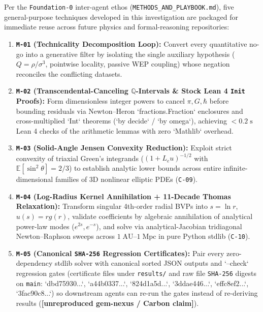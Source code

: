 \documentclass[11pt,letterpaper]{article}
\newcommand{\unrepro}{\textbf{\textcolor{red!60!black}{[unreproduced gem-nexus / Carbon claim]}}}
\begin{document}
Per the \texttt{Foundation-0} inter-agent ethos (\texttt{METHODS\_AND\_PLAYBOOK.md}), five general-purpose techniques developed in this investigation are packaged for immediate reuse across future physics and formal-reasoning repositories:
\begin{enumerate}
  \setlength{\itemsep}{2pt}\setlength{\parskip}{0pt}
  \item \textbf{\texttt{M-01} (Technicality Decomposition Loop):} Convert every quantitative no-go into a generative filter by isolating the single auxiliary hypothesis ($Q=\rho/\sigma^3$, pointwise locality, passive WEP coupling) whose negation reconciles the conflicting datasets.
  \item \textbf{\texttt{M-02} (Transcendental-Canceling $\mathbb{Q}$-Intervals \& Stock Lean 4 \texttt{Init} Proofs):} Form dimensionless integer powers to cancel $\pi, G, \hbar$ before bounding residuals via Newton--Heron `fractions.Fraction` enclosures and cross-multiplied `Int` theorems (`by decide` / `by omega`), achieving $<0.2\;\mathrm{s}$ Lean 4 checks of the arithmetic lemmas with zero `Mathlib` overhead.
  \item \textbf{\texttt{M-03} (Solid-Angle Jensen Convexity Reduction):} Exploit strict convexity of triaxial Green's integrands ($(1 + L_e u)^{-1/2}$ with $\mathbb{E}[\sin^2\theta] = 2/3$) to establish analytic lower bounds across entire infinite-dimensional families of 3D nonlinear elliptic PDEs (\texttt{C-09}).
  \item \textbf{\texttt{M-04} (Log-Radius Kernel Annihilation + 11-Decade Thomas Relaxation):} Transform singular 4th-order radial BVPs into $s=\ln r$, $u(s)=r g(r)$, validate coefficients by algebraic annihilation of analytical power-law modes ($e^{2s}, e^{-s}$), and solve via analytical-Jacobian tridiagonal Newton--Raphson sweeps across $1\;\mathrm{AU}$--$1\;\mathrm{Mpc}$ in pure Python stdlib (\texttt{C-10}).
  \item \textbf{\texttt{M-05} (Canonical \texttt{SHA-256} Regression Certificates):} Pair every zero-dependency stdlib solver with canonical sorted JSON outputs and `--check` regression gates (certificate files under \texttt{results/} and raw file \texttt{SHA-256} digests on \texttt{main}: `dbd75930...`, `a44b0337...`, `824d1a5d...`, `3ddae446...`, `effc8ef2...`, `3fac90c8...`) so downstream agents can re-run the gates instead of re-deriving results (\unrepro).
\end{enumerate}
\end{document}
